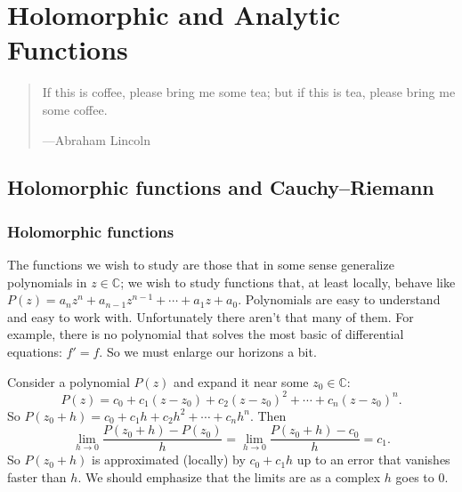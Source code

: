 \documentclass[12pt,openany]{book}
\newcommand{\C}{{\mathbb{C}}}
\theoremstyle{plain}
\theoremstyle{remark}
\theoremstyle{definition}
\newenvironment{myquote}{%
    \begin{quote}%
    \begingroup\itshape
}{%
    \endgroup%
    \end{quote}
}
\theoremstyle{exercise}
\theoremstyle{example}
\begin{document}

\chapter{Holomorphic and Analytic Functions} \label{ch:holanal}

\begin{myquote}
If this is coffee, please bring me some tea; but if this is tea, please bring me some coffee.

---Abraham Lincoln
\end{myquote}


\section{Holomorphic functions and Cauchy--Riemann}
\label{sec:holfuncs}

\subsection{Holomorphic functions}

The functions we wish to study are those that in some sense
generalize polynomials in $z \in \C$;  we wish to study functions
that,
at least locally, behave like $P(z) = a_n z^n + a_{n-1} z^{n-1} + \cdots +
a_1 z + a_0$.  Polynomials are easy to understand and easy to work
with.  Unfortunately there aren't that many of them.  For example, there is
no polynomial that solves the most basic of differential equations: $f' =
f$.  So we must enlarge our horizons a bit.

Consider a polynomial $P(z)$ and expand it near some $z_0 \in \C$:
\begin{equation*}
P(z) = c_0 + c_1 (z-z_0) + c_2 {(z-z_0)}^2 + \cdots + c_n {(z-z_0)}^n .
\end{equation*}
So $P(z_0+h) = c_0 + c_1 h + c_2 h^2 + \cdots + c_n h^n$.
Then
\begin{equation*}
\lim_{h \to 0} \frac{P(z_0+h) - P(z_0)}{h} =
\lim_{h \to 0} \frac{P(z_0+h) - c_0}{h} = c_1 .
\end{equation*}
So $P(z_0+h)$ is approximated (locally) by $c_0 + c_1 h$
up to an error that vanishes faster than $h$.
We should emphasize that the limits are as a complex $h$ goes to $0$.
\end{document}
